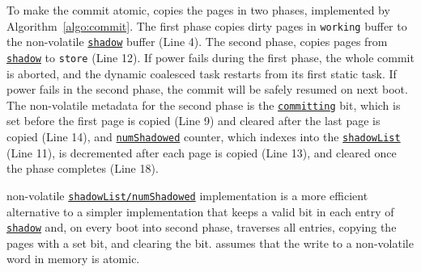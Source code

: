 To make the commit atomic, \sys copies the pages in two phases, implemented by
Algorithm~\ref{algo:commit}.
%
The first phase copies dirty pages in \texttt{working}
buffer to the non-volatile \texttt{\underline{shadow}} buffer (Line 4). 
The second phase, copies pages from \texttt{\underline{shadow}} to \texttt{store} (Line 12).
If power fails during the first phase, the whole
commit is aborted, and the dynamic coalesced task restarts from its first
static task. If power fails in the second phase, the commit will be safely
resumed on next boot.
The non-volatile metadata for the second phase is the \texttt{\underline{committing}}
bit, which is set before the first page is copied (Line 9) and cleared after the last
page is copied (Line 14), and \texttt{\underline{numShadowed}} counter, which
indexes into the \texttt{\underline{shadowList}} (Line 11), is
decremented after each page is copied (Line 13), and cleared once the phase
completes (Line 18).

\sys non-volatile \texttt{\underline{shadowList/numShadowed}} implementation is
a more efficient alternative to a simpler implementation that keeps a valid bit
in each entry of \texttt{\underline{shadow}} and, on every boot into second
phase, traverses all entries, copying the pages with a set bit, and
clearing the bit.
%
\sys assumes that the write to a non-volatile word in memory is atomic.

